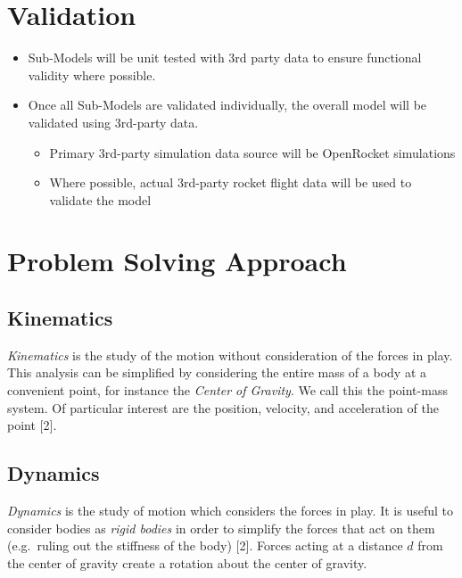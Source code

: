\documentclass[]{book}
\providecommand{\tightlist}{%
  \setlength{\itemsep}{0pt}\setlength{\parskip}{0pt}}
\begin{document}
\section{Validation}\label{validation}

\begin{itemize}
\tightlist
\item
  Sub-Models will be unit tested with 3rd party data to ensure
  functional validity where possible.
\item
  Once all Sub-Models are validated individually, the overall model will
  be validated using 3rd-party data.

  \begin{itemize}
  \tightlist
  \item
    Primary 3rd-party simulation data source will be OpenRocket
    simulations
  \item
    Where possible, actual 3rd-party rocket flight data will be used to
    validate the model
  \end{itemize}
\end{itemize}

\section{Problem Solving Approach}\label{problem-solving-approach}

\subsection{Kinematics}\label{kinematics}

\emph{Kinematics} is the study of the motion without consideration of
the forces in play. This analysis can be simplified by considering the
entire mass of a body at a convenient point, for instance the
\emph{Center of Gravity}. We call this the point-mass system. Of
particular interest are the position, velocity, and acceleration of the
point {[}2{]}.

\subsection{Dynamics}\label{dynamics}

\emph{Dynamics} is the study of motion which considers the forces in
play. It is useful to consider bodies as \emph{rigid bodies} in order to
simplify the forces that act on them (e.g.~ruling out the stiffness of
the body) {[}2{]}. Forces acting at a distance \(d\) from the center of
gravity create a rotation about the center of gravity.
\end{document}
